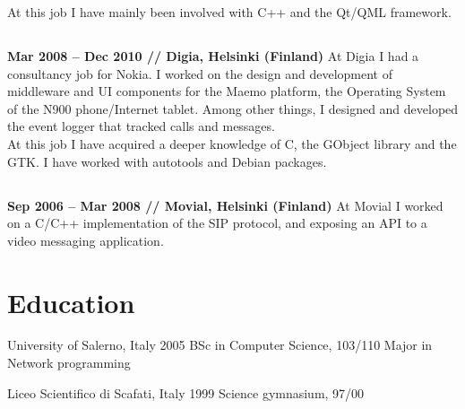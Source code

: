 \documentclass[10pt]{tccv}
\begin{document}
				At this job I have mainly been involved with C++ and the Qt/QML
				framework.

			\subsection{}
				\textbf{Mar 2008 -- Dec 2010 // Digia, Helsinki (Finland)} At
				Digia I had a consultancy job for Nokia. I worked on the design
				and development of middleware and UI components for the Maemo
				platform, the Operating System of the N900 phone/Internet
				tablet. Among other things, I designed and developed the event
				logger that tracked calls and messages.\\

				At this job I have acquired a deeper knowledge of C, the
				GObject library and the GTK. I have worked with autotools and
				Debian packages.

			\subsection{}
				\textbf{Sep 2006 -- Mar 2008 // Movial, Helsinki (Finland)} At
				Movial I worked on a C/C++ implementation of the SIP protocol,
				and exposing an API to a video messaging application.


		\section{Education}
			\begin{yearlist}
				\item[University of Salerno, Italy]{2005}
					{BSc in Computer Science, 103/110}
					{Major in Network programming}

				\item[Liceo Scientifico di Scafati, Italy]{1999}
					{Science gymnasium, 97/00}
					{}
			\end{yearlist}
\end{document}
